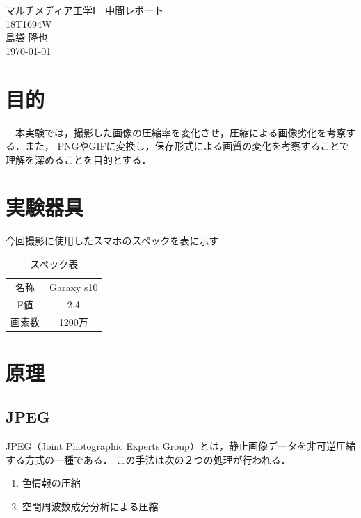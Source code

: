 \documentclass[a4paper,11pt]{bxjsarticle}
\begin{document}
\begin{titlepage}
  \begin{center}
    \vspace*{150truept}
    {\Huge マルチメディア工学Ⅰ　中間レポート}\\ %
    \vspace{120truept}
    {\huge 18T1694W}\\ %
    \vspace{50truept}
    {\huge 島袋 隆也}\\ %
    \vspace{50truept}
    {\huge \today}\\ %
  \end{center}
\end{titlepage}


\section{目的}
　本実験では，撮影した画像の圧縮率を変化させ，圧縮による画像劣化を考察する．また，
PNGやGIFに変換し，保存形式による画質の変化を考察することで理解を深めることを目的とする．


\section{実験器具}
  今回撮影に使用したスマホのスペックを表に示す. 
  \begin{table}[htb]
    \begin{center}
      \caption{スペック表}
      \begin{tabular}{|c|c|} \hline
        名称 & Garaxy s10  \\
        F値 & 2.4  \\
        画素数 & 1200万  \\ \hline

      \end{tabular}
      \label{tab:price}
    \end{center}
  \end{table}

\section{原理}
\subsection{JPEG}
JPEG（Joint Photographic Experts Group）とは，静止画像データを非可逆圧縮する方式の一種である．
この手法は次の２つの処理が行われる．
\begin{enumerate}
  \item 色情報の圧縮
  \item 空間周波数成分分析による圧縮
\end{enumerate}
\end{document}
